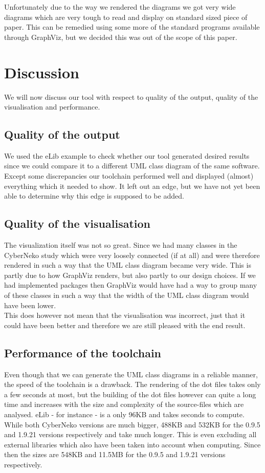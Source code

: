 \documentclass[a4paper,twoside,11pt]{article}
\begin{document}
Unfortunately due to the way we rendered the diagrams we got very wide diagrams which are very tough to read and display on standard sized piece of paper. This can be remedied using some more of the standard programs available through GraphViz, but we decided this was out of the scope of this paper.

\section{Discussion}
\label{sec:discussion}
We will now discuss our tool with respect to quality of the output, quality of the visualisation and performance.

\subsection{Quality of the output}
We used the eLib example to check whether our tool generated desired results since we could compare it to a different UML class diagram of the same software. Except some discrepancies our toolchain performed well and displayed (almost) everything which it needed to show. It left out an edge, but we have not yet been able to determine why this edge is supposed to be added.

\subsection{Quality of the visualisation}
The visualization itself was not so great. Since we had many classes in the CyberNeko study which were very loosely connected (if at all) and were therefore rendered in such a way that the UML class diagram became very wide. This is partly due to how GraphViz renders, but also partly to our design choices. If we had implemented packages then GraphViz would have had a way to group many of these classes in such a way that the width of the UML class diagram would have been lower. \\

This does however not mean that the visualisation was incorrect, just that it could have been better and therefore we are still pleased with the end result.

\subsection{Performance of the toolchain}
Even though that we can generate the UML class diagrams in a reliable manner, the speed of the toolchain is a drawback. The rendering of the dot files takes only a few seconds at most, but the building of the dot files however can quite a long time and increases with the size and complexity of the source-files which are analysed. eLib - for instance - is a only 96KB and takes seconds to compute. While both CyberNeko versions are much bigger, 488KB and 532KB for the 0.9.5 and 1.9.21 versions respectively and take much longer. This is even excluding all external libraries which also have been taken into account when computing. Since then the sizes are 548KB and 11.5MB for the 0.9.5 and 1.9.21 versions respectively.\\
\end{document}
